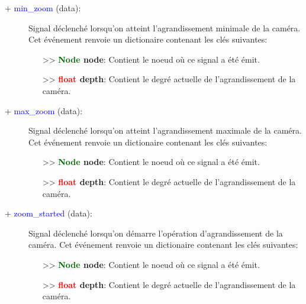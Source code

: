 \documentclass[a4paper, 11pt]{article}
\begin{document}
	\begin{description}
		\item [+ \textcolor{blue}{min\_zoom} (data):] Signal déclenché lorsqu'on atteint l'agrandissement 
		minimale de la caméra. Cet événement renvoie un dictionaire contenant les clés suivantes:
		\begin{itemize}
			\item [>> \textbf{\textcolor{darkgreen}{Node} node}:] Contient le noeud où ce signal a été émit.
			\item [>> \textbf{\textcolor{red}{float} depth}:] Contient le degré actuelle de
			l'agrandissement de la caméra.\\
		\end{itemize}
	\end{description}
	\begin{description}
		\item [+ \textcolor{blue}{max\_zoom} (data):] Signal déclenché lorsqu'on atteint l'agrandissement 
		maximale de la caméra. Cet événement renvoie un dictionaire contenant les clés suivantes:
		\begin{itemize}
			\item [>> \textbf{\textcolor{darkgreen}{Node} node}:] Contient le noeud où ce signal a été émit.
			\item [>> \textbf{\textcolor{red}{float} depth}:] Contient le degré actuelle de
			l'agrandissement de la caméra.\\
		\end{itemize}
	\end{description}
	\begin{description}
		\item [+ \textcolor{blue}{zoom\_started} (data):] Signal déclenché lorsqu'on démarre l'opération 
		d'agrandissement de la caméra. Cet événement renvoie un dictionaire contenant les clés suivantes:
		\begin{itemize}
			\item [>> \textbf{\textcolor{darkgreen}{Node} node}:] Contient le noeud où ce signal a été émit.
			\item [>> \textbf{\textcolor{red}{float} depth}:] Contient le degré actuelle de
			l'agrandissement de la caméra.\\
		\end{itemize}
	\end{description}
\end{document}
